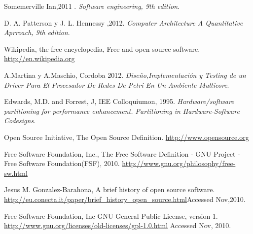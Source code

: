 \documentclass[a4paper,12pt]{report}
\begin{document}
\maketitle{}

\newpage
\tableofcontents{}

\newpage
\listoffigures{}


\newpage

\newpage

\newpage

\newpage

\newpage

\newpage

\newpage

\newpage
%
\newpage

\newpage

\newpage
%

\begin{thebibliography}{99}

 Somemerville Ian,2011 .
  \textit{Software engineering, 9th edition}.

 D. A. Patterson y J. L. Hennessy ,2012.
  \textit{Computer Architecture A Quantitative Aprroach, 9th edition}.

Wikipedia, the free encyclopedia, Free and open source software.
\url{http://en.wikipedia.org}

A.Martina y A.Maschio, Cordoba 2012.
  \textit{Diseño,Implementación y Testing de un Driver Para El Procesador De Redes De Petri En Un Ambiente Multicore}.

 Edwards, M.D. and Forrest, J, IEE Colloquiumon, 1995.
  \textit{ Hardware/software partitioning for performance enhancement. Partitioning in Hardware-Software Codesigns}.

 Open Source Initiative, The Open Source Definition.
 \url{http://www.opensource.org}

 Free Software Foundation, Inc., The Free Software Definition - GNU Project - Free Software Foundation(FSF), 2010.
 \url{http://www.gnu.org/philosophy/free-sw.html}

Jesus M. Gonzalez-Barahona, A brief history of open source software.
\url{http://eu.conecta.it/paper/brief_history_open_source.html}Accessed Nov,2010.

Free Software Foundation, Inc GNU General Public License, version 1.
\url{http://www.gnu.org/licenses/old-licenses/gpl-1.0.html} Accessed Nov, 2010.


\end{thebibliography}
\end{document}
